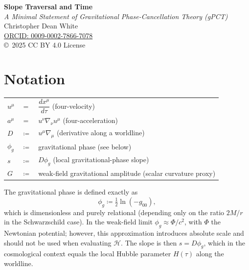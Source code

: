 \documentclass[12pt]{article}
\begin{document}
\begin{center}
    {\LARGE \textbf{Slope Traversal and Time}}\\[0.4em]
    \vspace{0.4em}
    {\large \textit{A Minimal Statement of Gravitational Phase-Cancellation Theory (gPCT)}}
\\[0.9em]
    Christopher Dean White\\
    \href{https://orcid.org/0009-0002-7866-7078}{ORCID: 0009-0002-7866-7078}\\
    \copyright~2025 \; CC BY 4.0 License\\
\end{center}

\section*{Notation}

\begin{tabular}{@{}lll@{}}
\vspace{0.4em}
$u^\mu$       & $=$          & $\dfrac{dx^\mu}{d\tau}$ \qquad (four-velocity) \\[4pt]
$a^\mu$       & $=$          & $u^\nu \nabla_\nu u^\mu$ \qquad (four-acceleration) \\[4pt]
$D$           & $\coloneqq$  & $u^\mu \nabla_\mu$ \quad (derivative along a worldline) \\[4pt]
$\phi_g$      & $\coloneqq$  & gravitational phase (see below) \\[4pt]

$s$           & $\coloneqq$  & $D\phi_g$ \quad (local gravitational-phase slope) \\[4pt]
$G$           & $\coloneqq$  & weak-field gravitational amplitude (scalar curvature proxy)
\end{tabular}

\vspace{0.4em}
\noindent The gravitational phase is defined exactly as
\[
\phi_g \coloneqq \tfrac{1}{2}\ln(-g_{00}),
\]
which is dimensionless and purely relational (depending only on the ratio $2M/r$ in the Schwarzschild case). In the weak-field limit $\phi_g \approx \Phi/c^2$, with $\Phi$ the Newtonian potential; however, this approximation introduces absolute scale and should not be used when evaluating $\mathcal{H}$. The slope is then $s = D\phi_g$, which in the cosmological context equals the local Hubble parameter $H(\tau)$ along the worldline.

\vspace{0.5em}
\end{document}

